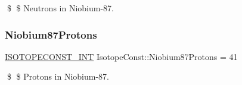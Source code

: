 \$ \$ Neutrons in Niobium-\/87. \mbox{\label{group___isotope_const-_niobium-_nb87_ga7554f294b2b35c3c3d99f26f3c39696d}} 
\subsubsection{\texorpdfstring{Niobium87\+Protons}{Niobium87Protons}}
{\footnotesize\ttfamily \mbox{\hyperlink{group___isotope_const-_macros_ga5f18360b3e99483a35c32d789e62621c}{I\+S\+O\+T\+O\+P\+E\+C\+O\+N\+S\+T\+\_\+\+I\+NT}} Isotope\+Const\+::\+Niobium87\+Protons = 41}

\$ \$ Protons in Niobium-\/87. 